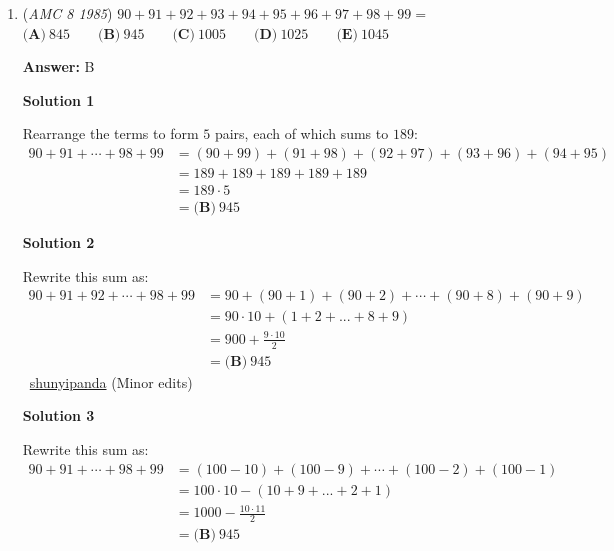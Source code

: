 \begin{enumerate}
This fraction can be simplified to 
 \[\frac{\prod_{k=1}^{5}(2k+1)}{\prod_{k=1}^{5}(2k+1)}\] The numerator and denominator are the same, so the answer is $\boxed{\textbf{(A)}\ 1}$. 

 


	\item (\textit{AMC 8 1985}) $90+91+92+93+94+95+96+97+98+99=$
$\textbf{(A)}\ 845 \qquad \textbf{(B)}\ 945 \qquad \textbf{(C)}\ 1005 \qquad \textbf{(D)}\ 1025 \qquad \textbf{(E)}\ 1045$

 \textbf{Answer: }B



\textbf{Solution 1}

Rearrange the terms to form $5$ pairs, each of which sums to $189$:
 \begin{align*} 90+91+\cdots +98+99 &= (90+99)+(91+98)+(92+97)+(93+96)+(94+95) \\ &= 189+189+189+189+189 \\ &= 189 \cdot 5 \\ &=\boxed{\textbf{(B)}\ 945} \end{align*}





\textbf{Solution 2}

Rewrite this sum as: 
 \begin{align*} 90 + 91 + 92 + \cdots + 98 + 99&= 90 + (90 + 1) + (90 + 2) + \cdots + (90 + 8) + (90 + 9) \\ &= 90 \cdot 10 + (1 + 2 + ... + 8 + 9) \\ &= 900 + \frac{9\cdot 10}{2} \\ &= \boxed{\textbf{(B)}\ 945}\end{align*}
~\href{https://artofproblemsolving.com/wiki/index.php?title=Shunyipanda&action=edit&redlink=1}{shunyipanda} (Minor edits)

 



\textbf{Solution 3}

Rewrite this sum as: 
 \begin{align*} 90 + 91 + \cdots + 98 + 99&= (100 - 10) + (100 - 9) + \cdots + (100 - 2) + (100 - 1) \\ &= 100 \cdot 10 - (10 + 9 + ... + 2 + 1) \\ &= 1000 - \frac{10 \cdot 11}{2} \\ &= \boxed{\textbf{(B)}\ 945}\end{align*}






\end{enumerate}
